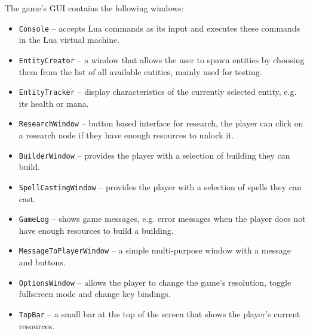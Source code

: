 The game's GUI contains the following windows:

\begin{itemize}
    \item \texttt{Console} -- accepts Lua commands as its input and executes these commands in the Lua virtual machine.
    \item \texttt{EntityCreator} -- a window that allows the user to spawn entities by choosing them from the list of all
        available entities, mainly used for testing.
    \item \texttt{EntityTracker} -- display characteristics of the currently selected entity, e.g. its health or mana.
    \item \texttt{ResearchWindow} -- button based interface for research, the player can click on a research node if they have
        enough resources to unlock it.
    \item \texttt{BuilderWindow} -- provides the player with a selection of building they can build.
    \item \texttt{SpellCastingWindow} -- provides the player with a selection of spells they can cast.
    \item \texttt{GameLog} -- shows game messages, e.g. error messages when the player does not have enough resources
        to build a building.
    \item \texttt{MessageToPlayerWindow} -- a simple multi-purpose window with a message and buttons.
    \item \texttt{OptionsWindow} -- allows the player to change the game's resolution, toggle fullscreen mode and change key bindings.
    \item \texttt{TopBar} -- a small bar at the top of the screen that shows the player's current resources.
\end{itemize}
